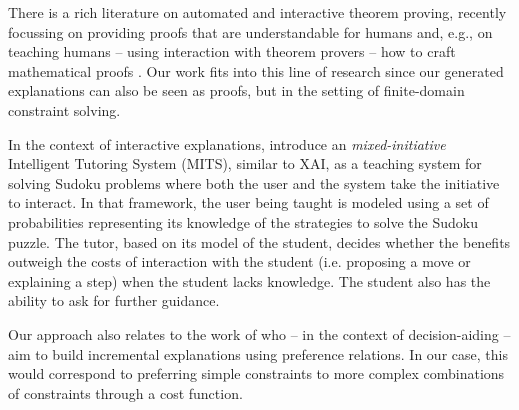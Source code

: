

There is a rich literature on automated and interactive theorem proving, recently focussing on providing proofs that are understandable for humans \cite{Ganesalingam2017} and, e.g.,  on teaching humans -- using interaction with theorem provers -- how to craft mathematical proofs \cite{DBLP:conf/icml/YangD19}.
Our work fits into this line of research since our generated explanations can also be seen as proofs, but in the setting of finite-domain constraint solving. 

In the context of interactive explanations, \cite{caine2006mits} introduce an \textit{mixed-initiative} Intelligent Tutoring System (MITS), similar to XAI, as a teaching system for solving Sudoku problems where both the user and the system take the initiative to interact.
In that framework, the user being taught is modeled using a set of probabilities representing its knowledge of the strategies to solve the Sudoku puzzle.
The tutor, based on its model of the student, decides whether the benefits outweigh the costs of interaction with the student (i.e. proposing a move or explaining a step) when the student lacks knowledge. The student also has the ability to ask for further guidance.


Our approach also relates to the work of \cite{belahcene2017explaining} who -- in the context of decision-aiding -- aim to build incremental explanations using preference relations. In our case, this would correspond to preferring simple constraints to more complex combinations of constraints through a cost function.
